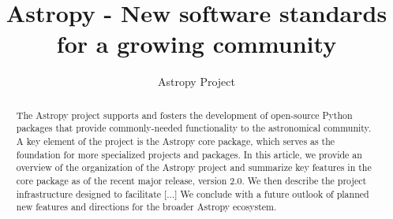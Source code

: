 \documentclass[modern]{aastex61}
\begin{document}
\draft{\today}

\title{Astropy - New software standards for a growing community}



\author{Astropy Project}

\begin{abstract}
The Astropy project supports and fosters the development of open-source Python
packages that provide commonly-needed functionality to the astronomical
community.
A key element of the project is the Astropy core package, which serves as the
foundation for more specialized projects and packages.
In this article, we provide an overview of the organization of the Astropy
project and summarize key features in the core package as of the recent major
release, version 2.0.
We then describe the project infrastructure designed to facilitate [...]
We conclude with a future outlook of planned new features and directions for the
broader Astropy ecosystem.
\end{abstract}
\end{document}

